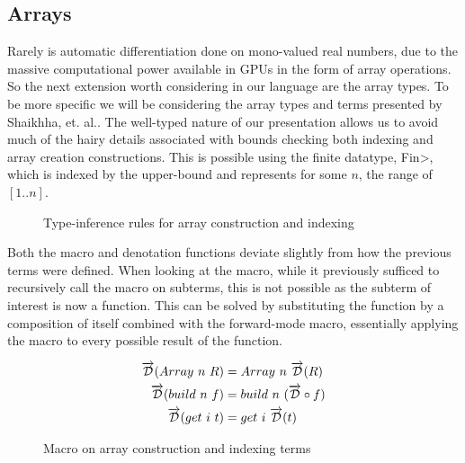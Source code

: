 \subsection{Arrays}
  Rarely is automatic differentiation done on mono-valued real numbers, due to the massive computational power available in GPUs in the form of array operations.
  So the next extension worth considering in our language are the array types.
  To be more specific we will be considering the array types and terms presented by Shaikhha, et. al.\cite{Shaikha2019}.
  The well-typed nature of our presentation allows us to avoid much of the hairy details associated with bounds checking both indexing and array creation constructions.
  This is possible using the finite datatype, \<Fin>, which is indexed by the upper-bound and represents for some $n$, the range of $[1..n]$.

  \begin{figure}
    \caption{Type-inference rules for array construction and indexing}
    \label{fig:array_infer}
  \end{figure}

  Both the macro and denotation functions deviate slightly from how the previous terms were defined.
  When looking at the macro, while it previously sufficed to recursively call the macro on subterms, this is not possible as the subterm of interest is now a function.
  This can be solved by substituting the function by a composition of itself combined with the forward-mode macro, essentially applying the macro to every possible result of the function.

  \begin{figure}
    \centering
    \begin{equation*}
      \begin{split}
        \overrightarrow{\mathcal{D}}(Array\ n\ R) &= Array\ n\ \overrightarrow{\mathcal{D}}(R) \\
        \overrightarrow{\mathcal{D}}(build\ n\ f) &= build\ n\ (\overrightarrow{\mathcal{D}} \circ f) \\
        \overrightarrow{\mathcal{D}}(get\ i\ t) &= get\ i\ \overrightarrow{\mathcal{D}}(t)
      \end{split}
    \end{equation*}
    \caption{Macro on array construction and indexing terms}
    \label{eqn:macro_array}
  \end{figure}

